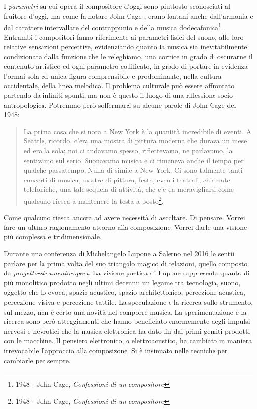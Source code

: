 I \emph{parametri} su cui opera il compositore d'oggi sono piuttosto sconosciuti
al fruitore d'oggi, ma come fa notare John Cage , erano lontani anche dall'armonia
e dal carattere intervallare del contrappunto e della musica
dodecafonica\footnote{1948 - John Cage, \emph{Confessioni di un compositore}}.
Entrambi i compositori fanno riferimento ai parametri fisici del suono, alle loro
relative sensazioni percettive, evidenziando quanto la musica sia inevitabilmente
condizionata dalla funzione che le releghiamo, una cornice in grado di oscurarne
il contenuto artistico ed ogni parametro codificato, in grado di portare in evidenza l'ormai sola ed unica
figura comprensibile e prodominante, nella cultura occidentale, della linea melodica.
Il problema culturale può essere affrontato partendo da infiniti spunti,
ma non è questo il luogo di una riflessione socio-antropologica. Potremmo
però soffermarci su alcune parole di John Cage del 1948:

\begin{quote}
  La prima cosa che si nota a New York è la quantità incredibile di eventi. A
  Seattle, ricordo, c'era una mostra di pittura moderna che durava un mese ed
  era la sola; noi ci andavamo spesso, riflettevamo, ne parlavamo, la sentivamo
  sul serio. Suonavamo musica e ci rimaneva anche il tempo per qualche passatempo.
  Nulla di simile a New York. Ci sono talmente tanti concerti di musica, mostre
  di pittura, feste, eventi teatrali, chiamate telefoniche, una tale sequela di attività,
  che c'è da meravigliarsi come qualcuno riesca a mantenere la testa a posto\footnote{1948 -
	John Cage, \emph{Confessioni di un compositore}}.
\end{quote}


Come qualcuno riesca ancora ad avere necessità di ascoltare. Di pensare. Vorrei
fare un ultimo ragionamento attorno alla composizione. Vorrei darle una
visione più complessa e tridimensionale.

Durante una conferenza di Michelangelo Lupone a
Salerno nel 2016 lo sentii parlare per la prima volta del suo triangolo magico
di relazioni, quello composto da \emph{progetto-strumento-opera}. La visione
poetica di Lupone rappresenta quanto di più monolitico prodotto negli ultimi
decenni: un legame tra tecnologia, suono, oggetto che lo evoca, spazio acustico, spazio
architettonico, percezione acustica, percezione visiva e percezione tattile.
La speculazione e la ricerca sullo strumento, sul mezzo, non è certo una novità
nel comporre musica. La sperimentazione e la ricerca sono però atteggiamenti che hanno
beneficiato enormemente degli impulsi nervosi e nevrotici che la musica elettronica
ha dato fin dai primi gemiti prodotti con le macchine. Il pensiero elettronico, o
elettroacustico, ha cambiato in maniera irrevocabile l'approccio alla composizone.
Si è insinuato nelle tecniche per cambiarle per sempre.

